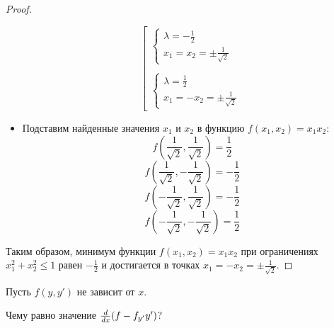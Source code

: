 \begin{proof}
\begin{itemize}
\[                  \left[
                  \begin{array}{ll}
                      \begin{cases}
                          \lambda = -\frac{1}{2} \\
                          x_1 = x_2 = \pm \frac{1}{\sqrt{2}}
                      \end{cases}
                      \\
                      \\
                      \begin{cases}
                          \lambda = \frac{1}{2} \\
                          x_1 = -x_2 = \pm \frac{1}{\sqrt{2}}
                      \end{cases}
                  \end{array}
                  \right.
              \]
        \item Подставим найденные значения $x_1$ и $x_2$ в функцию $f(x_1, x_2) = x_1 x_2$:
              \[
                  f\left(\frac{1}{\sqrt{2}}, \frac{1}{\sqrt{2}}\right) = \frac{1}{2}
              \]
              \[
                  f\left(\frac{1}{\sqrt{2}}, -\frac{1}{\sqrt{2}}\right) = -\frac{1}{2}
              \]
              \[
                  f\left(-\frac{1}{\sqrt{2}}, \frac{1}{\sqrt{2}}\right) = -\frac{1}{2}
              \]
              \[
                  f\left(-\frac{1}{\sqrt{2}}, -\frac{1}{\sqrt{2}}\right) = \frac{1}{2}
              \]
    \end{itemize}
    Таким образом, минимум функции $f(x_1, x_2) = x_1 x_2$ при ограничениях $x_1^2 + x_2^2 \le 1$ равен $-\frac{1}{2}$
    и достигается в точках $x_1 = - x_2 = \pm \frac{1}{\sqrt{2}}$.
\end{proof}

\begin{problem}
Пусть $f(y, y')$ не зависит от $x$.

Чему равно значение $\dv{x}(f - f_{y'}y')$?
\end{problem}

